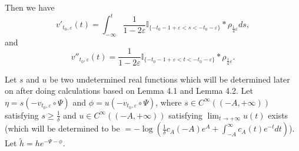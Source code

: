 Then we have
$$v'_{t_0,\varepsilon}(t)=\int_{-\infty}^{t}\frac{1}{1-2\varepsilon}
\mathbb{I}_{\{-t_{0}-1+\varepsilon<
s<-t_{0}-\varepsilon\}}*\rho_{\frac{1}{4}\varepsilon}ds,$$
and
$$v''_{t_0,\varepsilon}(t)=
\frac{1}{1-2\varepsilon}\mathbb{I}_{\{-t_{0}-1+\varepsilon<
t<-t_{0}-\varepsilon\}}*\rho_{\frac{1}{4}\varepsilon}.$$

Let $s$ and $u$ be two undetermined real functions which will be
determined later on after doing calculations based on Lemma
4.1 and Lemma 4.2. Let
$\eta=s(-v_{t_{0},\varepsilon}\circ\Psi)$ and
$\phi=u(-v_{t_{0},\varepsilon}\circ\Psi)$, where $s\in
C^{\infty}((-A,+\infty))$ satisfying $s\geq \frac{1}{\delta}$ and
$u\in C^{\infty}((-A,+\infty))$ satisfying $\lim_{t\to+\infty}u(t)$
exists (which will be determined to be
$=-\log(\frac{1}{\delta}c_{A}(-A)e^{A}+\int_{-A}^{\infty}c_{A}(t)e^{-t}dt)$).
Let $\tilde{h}=he^{-\Psi-\phi}$.

